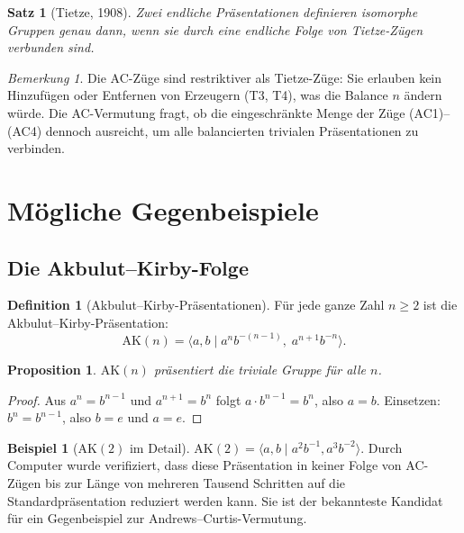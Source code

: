 \documentclass[12pt,a4paper]{amsart}
\newtheorem{satz}[theorem]{Satz}
\newtheorem{proposition}[theorem]{Proposition}
\theoremstyle{definition}
\newtheorem{definition_de}[theorem]{Definition}
\newtheorem{beispiel}[theorem]{Beispiel}
\theoremstyle{remark}
\newtheorem{bemerkung}[theorem]{Bemerkung}
\begin{document}
\begin{satz}[Tietze, 1908]
Zwei endliche Präsentationen definieren isomorphe Gruppen genau dann, wenn sie
durch eine endliche Folge von Tietze-Zügen verbunden sind.
\end{satz}

\begin{bemerkung}
Die AC-Züge sind restriktiver als Tietze-Züge: Sie erlauben kein Hinzufügen oder
Entfernen von Erzeugern (T3, T4), was die Balance $n$ ändern würde. Die AC-Vermutung
fragt, ob die eingeschränkte Menge der Züge (AC1)--(AC4) dennoch ausreicht,
um alle balancierten trivialen Präsentationen zu verbinden.
\end{bemerkung}

\section{Mögliche Gegenbeispiele}

\subsection{Die Akbulut--Kirby-Folge}

\begin{definition_de}[Akbulut--Kirby-Präsentationen]\label{def:AK}
Für jede ganze Zahl $n \geq 2$ ist die Akbulut--Kirby-Präsentation:
\[
  \mathrm{AK}(n) = \langle a, b \mid a^n b^{-(n-1)},\; a^{n+1} b^{-n} \rangle.
\]
\end{definition_de}

\begin{proposition}
$\mathrm{AK}(n)$ präsentiert die triviale Gruppe für alle $n$.
\end{proposition}

\begin{proof}
Aus $a^n = b^{n-1}$ und $a^{n+1} = b^n$ folgt $a \cdot b^{n-1} = b^n$, also $a = b$.
Einsetzen: $b^n = b^{n-1}$, also $b = e$ und $a = e$.
\end{proof}

\begin{beispiel}[$\mathrm{AK}(2)$ im Detail]
$\mathrm{AK}(2) = \langle a,b \mid a^2 b^{-1}, a^3 b^{-2} \rangle$.
Durch Computer wurde verifiziert, dass diese Präsentation in keiner Folge von
AC-Zügen bis zur Länge von mehreren Tausend Schritten auf die Standardpräsentation
reduziert werden kann. Sie ist der bekannteste Kandidat für ein Gegenbeispiel
zur Andrews--Curtis-Vermutung.
\end{beispiel}
\end{document}
